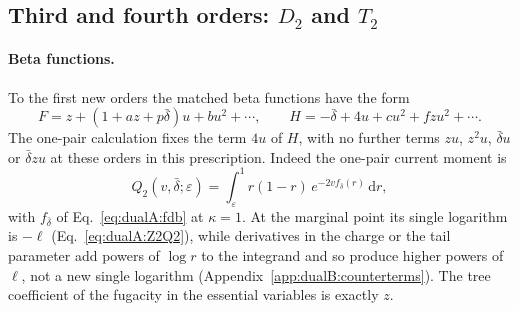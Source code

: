 \documentclass[11pt,a4paper]{article}
\numberwithin{equation}{section}
\newcommand{\dd}{\,\mathrm d}
\newcommand{\db}{\bar\delta}
\begin{document}
\subsection{Third and fourth orders: \texorpdfstring{$D_2$}{D2} and \texorpdfstring{$T_2$}{T2}}\label{app:dualB:D2T2}
\paragraph{Beta functions.} To the first new orders the matched beta functions have the form
\begin{equation}
 F=z+(1+az+p\db)u+bu^2+\cdots,\qquad H=-\db+4u+cu^2+fzu^2+\cdots.
 \label{eq:dualB:beta2}
\end{equation}
The one-pair calculation fixes the term $4u$ of $H$, with no further terms $zu$, $z^2u$, $\db u$ or $\db zu$ at these
orders in this prescription. Indeed the one-pair current moment is
\begin{equation}
 Q_2(v,\db;\varepsilon)=\int_\varepsilon^1r(1-r)\,e^{-2vf_{\db}(r)}\dd r,
\end{equation}
with $f_{\db}$ of Eq.~\eqref{eq:dualA:fdb} at $\kappa=1$. At the marginal point its single logarithm is $-\ell$
(Eq.~\eqref{eq:dualA:Z2Q2}), while derivatives in the charge or the tail parameter add powers of $\log r$ to the
integrand and so produce higher powers of $\ell$, not a new single logarithm
(Appendix~\ref{app:dualB:counterterms}). The tree coefficient of the fugacity in the essential variables is exactly
$z$.
\end{document}
